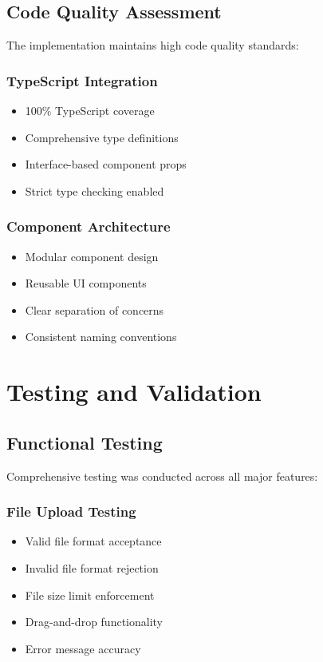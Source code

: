 \documentclass[12pt,a4paper]{article}
\begin{document}
\subsection{Code Quality Assessment}
The implementation maintains high code quality standards:

\subsubsection{TypeScript Integration}
\begin{itemize}
    \item 100\% TypeScript coverage
    \item Comprehensive type definitions
    \item Interface-based component props
    \item Strict type checking enabled
\end{itemize}

\subsubsection{Component Architecture}
\begin{itemize}
    \item Modular component design
    \item Reusable UI components
    \item Clear separation of concerns
    \item Consistent naming conventions
\end{itemize}

\section{Testing and Validation}

\subsection{Functional Testing}
Comprehensive testing was conducted across all major features:

\subsubsection{File Upload Testing}
\begin{itemize}
    \item Valid file format acceptance
    \item Invalid file format rejection
    \item File size limit enforcement
    \item Drag-and-drop functionality
    \item Error message accuracy
\end{itemize}
\end{document}
